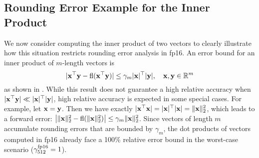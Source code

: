 \subsection{Rounding Error Example for the Inner Product}\label{sec:backgroundIP}
We now consider computing the inner product of two vectors to clearly illustrate how this situation restricts rounding error analysis in fp16. 
An error bound for an inner product of $m$-length vectors is
\begin{equation}
|\bb{x}^{\top}\bb{y} - \fl(\bb{x}^{\top}\bb{y})| \leq \gamma_{m} |\bb{x}|^{\top}|\bb{y}|, \quad \bb{x},\bb{y}\in\R^{m} \label{eqn:DDerr}
\end{equation}
as shown in \cite{Higham2002}.
While this result does not guarantee a high relative accuracy when $|\mathbf{x}^{\top}\mathbf{y}| \ll |\mathbf{x}|^{\top}|\mathbf{y}|$, high relative accuracy is expected in some special cases.
For example, let $\mathbf{x}=\mathbf{y}$.
Then we have exactly $|\mathbf{x}^{\top}\mathbf{x}| = |\mathbf{x}|^{\top}|\mathbf{x}|=\|\mathbf{x}\|_2^2$, which leads to a forward error: $\left|\|\mathbf{x}\|_2^2 - \mathrm{fl}(\|\mathbf{x}\|_2^2)\right| \leq \gamma_m \|\mathbf{x}\|_2^2$.
Since vectors of length $m$ accumulate rounding errors that are bounded by $\gamma_{m}$, the dot products of vectors computed in fp16 already face a 100\% relative error bound in the worst-case scenario ($\gamma_{512}^\text{\text{fp16}}=1$). \par

